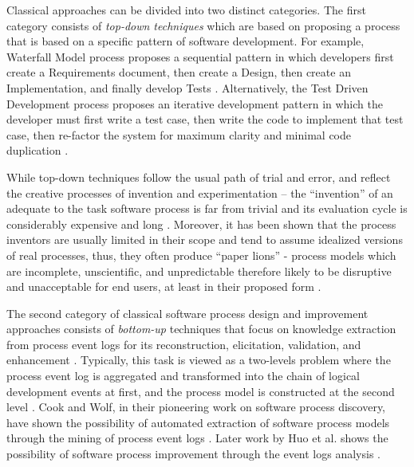 Classical approaches can be divided into two distinct categories. 
The first category consists of \textit{top-down techniques} which are based on proposing a process 
that is based on a specific pattern of software development. 
For example, Waterfall Model process proposes a sequential pattern in which developers first create a 
Requirements document, then create a Design, then create an Implementation, and finally develop Tests 
\cite{citeulike:9982731}. 
Alternatively,  the Test Driven Development process proposes an iterative development pattern in which
the developer must first write a test case, then write the code to implement that test case, then re-factor 
the system for maximum clarity and minimal code duplication \cite{Beck_TDD}. 

While top-down techniques follow the usual path of trial and error, and reflect the creative processes 
of invention and experimentation -- the ``invention'' of an adequate to 
the task software process is far from trivial and its evaluation cycle is considerably expensive 
and long \cite{citeulike:5043104} \cite{citeulike:1986013}.
Moreover, it has been shown that the process inventors are usually limited in their scope and tend to 
assume idealized versions of real processes, thus, they often produce ``paper lions'' - process 
models which are incomplete, unscientific, and unpredictable \cite{citeulike:13208461} therefore likely 
to be disruptive and unacceptable for end users, at least in their proposed form \cite{citeulike:9758924}.

The second category of classical software process design and improvement approaches consists of 
\textit{bottom-up} techniques that focus on knowledge extraction from process event logs for 
its reconstruction, elicitation, validation, and enhancement \cite{citeulike:12944447}. 
Typically, this task is viewed as a two-levels problem where the process event log is aggregated and 
transformed into the chain of logical development events at first, 
and the process model is constructed at the second level \cite{citeulike:2703162} \cite{citeulike:12944447}.
Cook and Wolf, in their pioneering work on software process discovery, have shown the possibility of 
automated extraction of software process models through the mining of process event logs 
\cite{citeulike:328044} \cite{citeulike:5120757} \cite{citeulike:5128143}. 
Later work by Huo et al. shows the possibility of software process improvement through the event 
logs analysis \cite{citeulike:7691059} \cite{citeulike:7690766}. 

